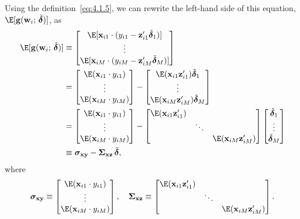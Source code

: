 Using the definition~\eqref{eq:4.1.5}, we can rewrite the left-hand side of this
equation, $\E[\mathbf{g}(\mathbf{w}_i;\, \tilde{\boldsymbol{\delta}})]$, as
\begin{align}
\E[\mathbf{g}(\mathbf{w}_i;\, \tilde{\boldsymbol{\delta}})]
&\equiv \begin{bmatrix}
\E[\mathbf{x}_{i1} \cdot (y_{i1} - \mathbf{z}_{i1}' \tilde{\boldsymbol{\delta}}_1)] \\
\vdots \\
\E[\mathbf{x}_{iM} \cdot (y_{iM} - \mathbf{z}_{iM}' \tilde{\boldsymbol{\delta}}_M)]
\end{bmatrix} \notag \\
&= \begin{bmatrix}
\E(\mathbf{x}_{i1} \cdot y_{i1}) \\ \vdots \\ \E(\mathbf{x}_{iM} \cdot y_{iM})
\end{bmatrix}
- \begin{bmatrix}
\E(\mathbf{x}_{i1} \mathbf{z}_{i1}') \tilde{\boldsymbol{\delta}}_1 \\
\vdots \\
\E(\mathbf{x}_{iM} \mathbf{z}_{iM}') \tilde{\boldsymbol{\delta}}_M
\end{bmatrix} \notag \\
&= \begin{bmatrix}
\E(\mathbf{x}_{i1} \cdot y_{i1}) \\ \vdots \\ \E(\mathbf{x}_{iM} \cdot y_{iM})
\end{bmatrix}
- \begin{bmatrix}
\E(\mathbf{x}_{i1} \mathbf{z}_{i1}') & & \\
& \ddots & \\
& & \E(\mathbf{x}_{iM} \mathbf{z}_{iM}')
\end{bmatrix}
\begin{bmatrix} \tilde{\boldsymbol{\delta}}_1 \\ \vdots \\ \tilde{\boldsymbol{\delta}}_M \end{bmatrix}
\notag \\
&\equiv \boldsymbol{\sigma}_{\mathbf{x}\mathbf{y}}
- \boldsymbol{\Sigma}_{\mathbf{x}\mathbf{z}}\, \tilde{\boldsymbol{\delta}},
\label{eq:4.1.8}
\end{align}
where
\begin{equation}
\boldsymbol{\sigma}_{\mathbf{x}\mathbf{y}}
\equiv \begin{bmatrix}
\E(\mathbf{x}_{i1} \cdot y_{i1}) \\ \vdots \\ \E(\mathbf{x}_{iM} \cdot y_{iM})
\end{bmatrix}, \quad
\boldsymbol{\Sigma}_{\mathbf{x}\mathbf{z}}
\equiv \begin{bmatrix}
\E(\mathbf{x}_{i1} \mathbf{z}_{i1}') & & \\
& \ddots & \\
& & \E(\mathbf{x}_{iM} \mathbf{z}_{iM}')
\end{bmatrix}.
\label{eq:4.1.9}
\end{equation}
